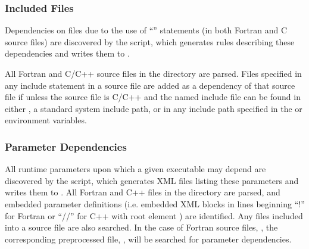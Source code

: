 \subsubsection{Included Files}\label{sec:buildIncludeDeps}

Dependencies on files due to the use of ``'' statements (in both Fortran and C source files) are discovered by the  script, which generates rules describing these dependencies and writes them to .

All Fortran and C/C++ source files in the  directory are parsed. Files specified in any include statement in a source file are added as a dependency of that source file if unless the source file is C/C++ and the named include file can be found in either , a standard system include path, or in any include path specified in the  or  environment variables.

\subsubsection{Parameter Dependencies}\label{sec:parameterDependencies}

All runtime parameters upon which a given executable may depend are discovered by the  script, which generates XML files listing these parameters and writes them to . All Fortran and C++ files in the  directory are parsed, and embedded parameter definitions (i.e. embedded XML blocks in lines beginning ``!\@'' for Fortran or ``//\@'' for C++ with root element ) are identified. Any files included into a source file are also searched. In the case of Fortran source files, , the corresponding preprocessed file, , will be searched for parameter dependencies.

